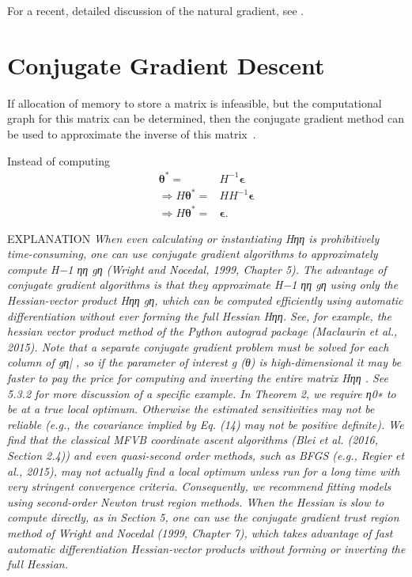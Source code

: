 \cite{kingma2014adam}
\cite{martens2015optimizing}
\cite{botev2017practical}

For a recent, detailed discussion of the natural gradient, see \cite{martens2020new}.
\cite{wu2019logan}

\section{Conjugate Gradient Descent}

If allocation of memory to store a matrix is infeasible, but the computational graph for this matrix can be determined, then the conjugate gradient method can be used to approximate the inverse of this matrix~\cite{giordano2018covariances, nocedal1999numerical}.

Instead of computing
\begin{align*}
    \bm \theta^* ={} & H^{-1} \bm \epsilon
    \\\Rightarrow H \bm \theta^* ={} & H H^{-1} \bm \epsilon
    \\\Rightarrow H \bm \theta^* ={}& \bm \epsilon.
\end{align*}

EXPLANATION
\emph{When even calculating or instantiating Hηη is prohibitively time-consuming, one can use conjugate gradient algorithms to approximately compute H−1 ηη gη (Wright and Nocedal, 1999, Chapter 5). The advantage of conjugate gradient algorithms is that they approximate H−1 ηη gη using only the Hessian-vector product Hηη gη, which can be computed efficiently using automatic differentiation without ever forming the full Hessian Hηη. See, for example, the hessian vector product method of the Python autograd package (Maclaurin et al., 2015). Note that a separate conjugate gradient problem must be solved for each column of gη| , so if the parameter of interest g (θ) is high-dimensional it may be faster to pay the price for computing and inverting the entire matrix Hηη . See 5.3.2 for more discussion of a specific example. In Theorem 2, we require η0∗ to be at a true local optimum. Otherwise the estimated sensitivities may not be reliable (e.g., the covariance implied by Eq. (14) may not be positive definite). We find that the classical MFVB coordinate ascent algorithms (Blei et al. (2016, Section 2.4)) and even quasi-second order methods, such as BFGS (e.g., Regier et al., 2015), may not actually find a local optimum unless run for a long time with very stringent convergence criteria. Consequently, we recommend fitting models using second-order Newton trust region methods. When the Hessian is slow to compute directly, as in Section 5, one can use the conjugate gradient trust region method of Wright and Nocedal (1999, Chapter 7), which takes advantage of fast automatic differentiation Hessian-vector products without forming or inverting the full Hessian.}
